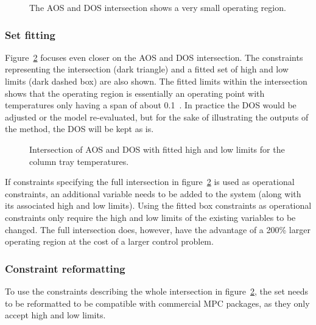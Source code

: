 \begin{figure}[htbp]
  \centering
    \scalebox{1}{}  
  \caption[AOS and DOS intersection of the laboratory distillation column]{The AOS and DOS intersection shows a very small operating region.}
  \label{fig:columnaosfocus}
\end{figure}

\subsubsection{Set fitting}
Figure~\ref{fig:columnfitbox} focuses even closer on the AOS and DOS intersection.
The constraints representing the intersection (dark triangle) and a fitted set of high and low limits (dark dashed box) are also shown.
The fitted limits within the intersection shows that the operating region is essentially an operating point with temperatures only having a span of about 0.1~\textcelsius.
In practice the DOS would be adjusted or the model re-evaluated, but for the sake of illustrating the outputs of the method, the DOS will be kept as is.
  
\begin{figure}[htbp]
  \centering
    \scalebox{1}{}  
  \caption[Fitted constraints for the laboratory distillation column]{Intersection of AOS and DOS with fitted high and low limits for the column tray temperatures.}
  \label{fig:columnfitbox}
\end{figure}

If constraints specifying the full intersection in figure~\ref{fig:columnfitbox} is used as operational constraints, an additional variable needs to be added to the system (along with its associated high and low limits).
Using the fitted box constraints as operational constraints only require the high and low limits of the existing variables to be changed.
The full intersection does, however, have the advantage of a 200\% larger operating region at the cost of a larger control problem.

\subsubsection{Constraint reformatting}
To use the constraints describing the whole intersection in figure~\ref{fig:columnfitbox}, the set needs to be reformatted to be compatible with commercial MPC packages, as they only accept high and low limits.

